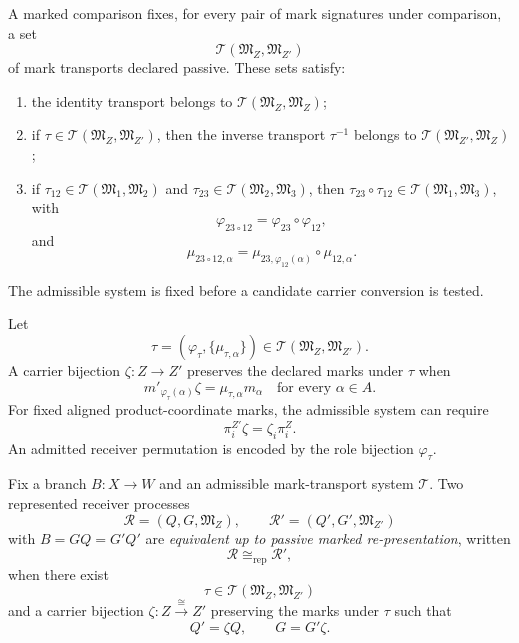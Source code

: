 \begin{definition}\label{def:admissible-mark-transport-v15}
A marked comparison fixes, for every pair of mark signatures under comparison, a set
\[
\mathcal T(\mathfrak M_Z,\mathfrak M_{Z'})
\]
of mark transports declared passive. These sets satisfy:
\begin{enumerate}[label=(\roman*)]
\item the identity transport belongs to $\mathcal T(\mathfrak M_Z,\mathfrak M_Z)$;
\item if $\tau\in\mathcal T(\mathfrak M_Z,\mathfrak M_{Z'})$, then the inverse transport $\tau^{-1}$ belongs to $\mathcal T(\mathfrak M_{Z'},\mathfrak M_Z)$;
\item if $\tau_{12}\in\mathcal T(\mathfrak M_1,\mathfrak M_2)$ and $\tau_{23}\in\mathcal T(\mathfrak M_2,\mathfrak M_3)$, then $\tau_{23}\circ\tau_{12}\in\mathcal T(\mathfrak M_1,\mathfrak M_3)$, with
\[
\varphi_{23\circ12}=\varphi_{23}\circ\varphi_{12},
\]
and
\[
\mu_{23\circ12,\alpha}
=
\mu_{23,\varphi_{12}(\alpha)}\circ\mu_{12,\alpha}.
\]
\end{enumerate}
The admissible system is fixed before a candidate carrier conversion is tested.
\end{definition}

\begin{definition}\label{def:mark-preserving-representation-v15}
Let
\[
\tau=(\varphi_\tau,\{\mu_{\tau,\alpha}\})
\in\mathcal T(\mathfrak M_Z,\mathfrak M_{Z'}).
\]
A carrier bijection $\zeta:Z\to Z'$ preserves the declared marks under $\tau$ when
\[
\boxed{
m'_{\varphi_\tau(\alpha)}\zeta
=\mu_{\tau,\alpha}m_\alpha
\quad\text{for every }\alpha\in A.
}
\]
For fixed aligned product-coordinate marks, the admissible system can require
\[
\pi_i^{Z'}\zeta=\zeta_i\pi_i^Z.
\]
An admitted receiver permutation is encoded by the role bijection $\varphi_\tau$.
\end{definition}

\begin{definition}\label{def:marked-process-equivalence-v14}
Fix a branch $B:X\to W$ and an admissible mark-transport system $\mathcal T$. Two represented receiver processes
\[
\mathcal R=(Q,G,\mathfrak M_Z),
\qquad
\mathcal R'=(Q',G',\mathfrak M_{Z'})
\]
with $B=GQ=G'Q'$ are \emph{equivalent up to passive marked re-presentation}, written
\[
\mathcal R\cong_{\mathrm{rep}}\mathcal R',
\]
when there exist
\[
\tau\in\mathcal T(\mathfrak M_Z,\mathfrak M_{Z'})
\]
and a carrier bijection $\zeta:Z\xrightarrow{\cong}Z'$ preserving the marks under $\tau$ such that
\[
\boxed{Q'=\zeta Q,
\qquad
G=G'\zeta.}
\]
\end{definition}

